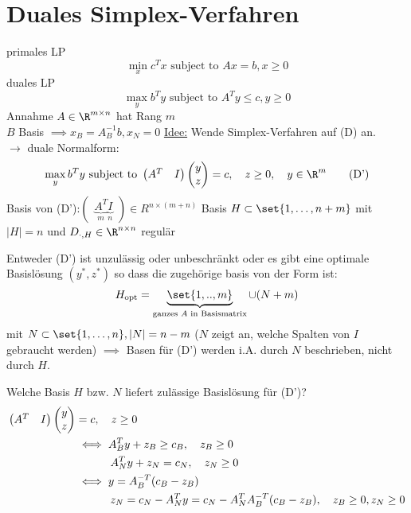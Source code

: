 \section{Duales Simplex-Verfahren}
primales LP
\begin{equation*}\label{primalLP}
	\min_{x}c^{T} x \text{ subject to }Ax = b, x \geq 0 \tag{P}
\end{equation*}
duales LP
\begin{equation*}\label{dualLP}
	\max_{y}b^{T} y \text{ subject to }A^{T} y \leq c, y \geq 0 \tag{D}
\end{equation*}
Annahme $A \in \R^{m \times n}$ hat Rang $m$ \\
$B$ Basis $\implies x_{B}= A^{-1}_{B}b, x_{N}=0$\nl
\underline{Idee:} Wende Simplex-Verfahren auf (D) an.\\
$\to$ duale Normalform:
\begin{equation*}\label{dualnf}
	\max_{y} b^{T} y \text{ subject to }
	\begin{pmatrix}
		A^{T} & I
	\end{pmatrix}
	\begin{pmatrix}
	y\\z
	\end{pmatrix}
	= c, \quad z \geq 0, \quad y \in \R^m \tag{D'}
\end{equation*}
Basis von (D'):$
\begin{pmatrix}
	\underbrace{A^{T}}_{m} \underbrace{I}_{n}
\end{pmatrix}
\in R^{n \times(m +n)}$
Basis $H \subset \set{1,\dots ,n+m }$ mit $|H|=n$ und $D_{\cdot,H}\in \R^{n \times n}$ regulär
\begin{theorem}
	Entweder (D') ist unzulässig oder unbeschränkt oder es gibt eine optimale Basislösung $(y^*,z^*)$ so dass die zugehörige basis von der Form ist:
	\begin{equation*}
		H_{\text{opt}}=\underbrace{ \set{1,..,m }}_{\text{ganzes $A$ in Basismatrix}}\cup (N+m)
	\end{equation*}
	mit $N \subset \set{1,\dots ,n }, |N|= n-m$ ($N$ zeigt an, welche Spalten von $I$ gebraucht werden)
	$\implies$ Basen für (D') werden i.A. durch $N$ beschrieben, nicht durch $H$.
\end{theorem}
Welche Basis $H$ bzw. $N$ liefert zulässige Basislösung für (D')?
\begin{align*}
	\begin{pmatrix}
		A^{T}  & I
	\end{pmatrix}
	\begin{pmatrix}
	y\\z
	\end{pmatrix}
	&=c, \quad z \geq 0\\
	&{}\iff A_{B}^{T} y + z_{B} \geq c_{B}, \quad z_{B} \geq 0\\
	&{}\hspace{1.1cm} A_{N}^{T} y + z_{N} = c_{N}, \quad z_{N} \geq 0 \\
	&{}\iff y = A_{B}^{-T}(c_{B}-z_{B})\\
	&{}\hspace{1.1cm} z_{N}= c_{N} - A_{N}^{T}y = c_{N}-A_{N}^{T} A_{B}^{-T}(c_{B}-z_{B}) ,\quad z_{B}\geq 0 ,z_{N} \geq 0
\end{align*}
